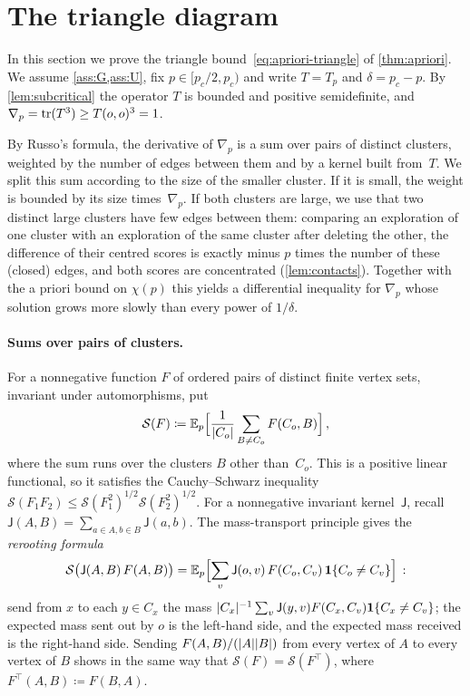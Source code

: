 \section{The triangle diagram}\label{sec:triangle}

In this section we prove the triangle bound~\eqref{eq:apriori-triangle} of \cref{thm:apriori}. We assume
\cref{ass:G,ass:U}, fix $p\in[p_c/2,p_c)$ and write $T=T_p$ and $\delta=p_c-p$. By
\cref{lem:subcritical} the operator $T$ is bounded and positive semidefinite, and
$\nabla_p=\operatorname{tr}(T^3)\ge T(o,o)^3=1$.

By Russo's formula, the derivative of $\nabla_p$ is a sum over pairs of distinct clusters, weighted by
the number of edges between them and by a kernel built from~$T$. We split this sum according to the size
of the smaller cluster. If it is small, the weight is bounded by its size times~$\nabla_p$. If both
clusters are large, we use that two distinct large clusters have few edges between them: comparing an
exploration of one cluster with an exploration of the same cluster after deleting the other, the
difference of their centred scores is exactly minus $p$ times the number of these (closed) edges, and
both scores are concentrated (\cref{lem:contacts}). Together with the a priori bound on $\chi(p)$ this
yields a differential inequality for $\nabla_p$ whose solution grows more slowly than every power of
$1/\delta$.

\paragraph{Sums over pairs of clusters.}
For a nonnegative function $F$ of ordered pairs of distinct finite vertex sets, invariant under
automorphisms, put
\begin{equation*}
  \mathcal S(F)\coloneqq\mathbb E_p\Bigl[\frac1{\lvert C_o\rvert}\sum_{B\neq C_o}F(C_o,B)\Bigr]\,,
\end{equation*}
where the sum runs over the clusters $B$ other than~$C_o$. This is a positive linear functional, so it
satisfies the Cauchy--Schwarz inequality $\mathcal S(F_1F_2)\le\mathcal S(F_1^2)^{1/2}\mathcal S(F_2^2)^{1/2}$.
For a nonnegative invariant kernel~$\mathsf J$, recall $\mathsf J(A,B)=\sum_{a\in A,b\in B}\mathsf J(a,b)$. The mass-transport
principle gives the \emph{rerooting formula}
\begin{equation}\label{eq:reroot}
  \mathcal S\bigl(\mathsf J(A,B)\,F(A,B)\bigr)=\mathbb E_p\Bigl[\sum_v\mathsf J(o,v)\,F(C_o,C_v)\,\mathbf{1}\{C_o\neq C_v\}\Bigr]\,:
\end{equation}
send from $x$ to each $y\in C_x$ the mass $\lvert C_x\rvert^{-1}\sum_v\mathsf J(y,v)F(C_x,C_v)\mathbf{1}\{C_x\neq C_v\}$; the
expected mass sent out by $o$ is the left-hand side, and the expected mass received is the right-hand
side. Sending $F(A,B)/(\lvert A\rvert\lvert B\rvert)$ from every vertex of $A$ to every vertex of $B$ shows in the same
way that $\mathcal S(F)=\mathcal S(F^\top)$, where $F^\top(A,B)\coloneqq F(B,A)$.

